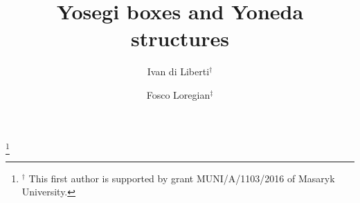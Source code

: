 \title{Yosegi boxes and Yoneda structures}
\author[Di Liberti]{Ivan di Liberti$^\dag$}
\author[Loregian]{Fosco Loregian$^\ddag$}
\thanks{$^\dag$ This first author is supported by grant MUNI/A/1103/2016 of Masaryk University.}

\address{
$^\dag$Department of Mathematics and Statistics\newline
Masaryk University, Faculty of Sciences\newline
Kotl\'{a}\v{r}sk\'{a} 2, 611 37 Brno, Czech Republic\newline
\href{mailto:diliberti@math.muni.cz}{\sf diliberti@math.muni.cz}\newline
}
\address{
	$\ddag$Max Planck Institute for Mathematics\newline
	Vivatsgasse 7, 53111 Bonn --- Germany\newline
	\href{mailto:flore@mpim-bonn.mpg.de}{\sf flore@mpim-bonn.mpg.de}
}
